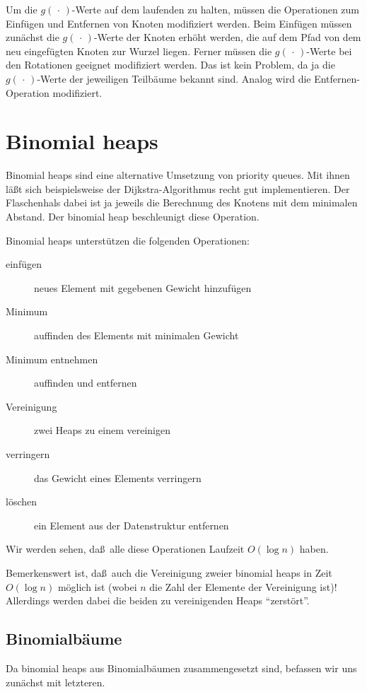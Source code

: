 \documentclass[10pt,reqno]{amsart}
\numberwithin{equation}{section}
\newcommand\nix{\,\cdot\,}
\begin{document}
Um die $g(\nix)$-Werte auf dem laufenden zu halten, m\"ussen die Operationen zum Einf\"ugen und Entfernen von Knoten modifiziert werden.
Beim Einf\"ugen m\"ussen zun\"achst die $g(\nix)$-Werte der Knoten erh\"oht werden, die auf dem Pfad von dem neu eingef\"ugten Knoten zur Wurzel liegen.
Ferner m\"ussen die $g(\nix)$-Werte bei den Rotationen geeignet modifiziert werden.
Das ist kein Problem, da ja die $g(\nix)$-Werte der jeweiligen Teilb\"aume bekannt sind.
Analog wird die Entfernen-Operation modifiziert.

\section{Binomial heaps}\label{sec_binomial}

\noindent
Binomial heaps sind eine alternative Umsetzung von priority queues.
Mit ihnen l\"a\ss t sich beispielsweise der Dijkstra-Algorithmus recht gut implementieren.
Der Flaschenhals dabei ist ja jeweils die Berechnung des Knotens mit dem minimalen Abstand.
Der binomial heap beschleunigt diese Operation.

Binomial heaps unterst\"utzen die folgenden Operationen:
\begin{description}
	\item[einf\"ugen] neues Element mit gegebenen Gewicht hinzuf\"ugen
	\item[Minimum] auffinden des Elements mit minimalen Gewicht
	\item[Minimum entnehmen] auffinden und entfernen
	\item[Vereinigung] zwei Heaps zu einem vereinigen
	\item[verringern] das Gewicht eines Elements verringern
	\item[l\"oschen] ein Element aus der Datenstruktur entfernen
\end{description}
Wir werden sehen, da\ss\ alle diese Operationen Laufzeit $O(\log n)$ haben.

Bemerkenswert ist, da\ss\ auch die Vereinigung zweier binomial heaps in Zeit $O(\log n)$ m\"oglich ist (wobei $n$ die Zahl der Elemente der Vereinigung ist)!
Allerdings werden dabei die beiden zu vereinigenden Heaps ``zerst\"ort''.

\subsection{Binomialb\"aume}\label{sec_binomial_trees}
Da binomial heaps aus Binomialb\"aumen zusammengesetzt sind, befassen wir uns zun\"achst mit letzteren.
\end{document}

